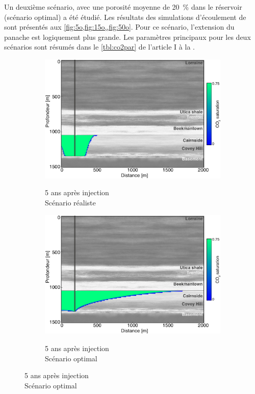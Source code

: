 Un deuxième scénario, avec une porosité moyenne de \SI{20}{\percent} dans le
réservoir (scénario optimal) a été étudié. Les résultats des simulations
d'écoulement de  sont présentés aux \cref{fig:5o,fig:15o,,fig:50o}. Pour
ce scénario, l'extension du panache est logiquement plus grande. Les paramètres
principaux pour les deux scénarios sont résumés dans le \cref{tbl:co2par} de
l'article I à la .
\begin{figure}[p]
        \centering
        \begin{subfigure}[b]{.47\textwidth}
                \caption{5 ans après injection \\ Scénario réaliste }
                \includegraphics[width=\textwidth]{fig/5r.pdf}
                \label{fig:5r}
        \end{subfigure}
        \qquad
        \begin{subfigure}[b]{.47\textwidth}
                \caption{5 ans après injection \\ Scénario optimal}
                \includegraphics[width=\textwidth]{fig/5o.pdf}
                \label{fig:5o}
        \end{subfigure}


\end{figure}
